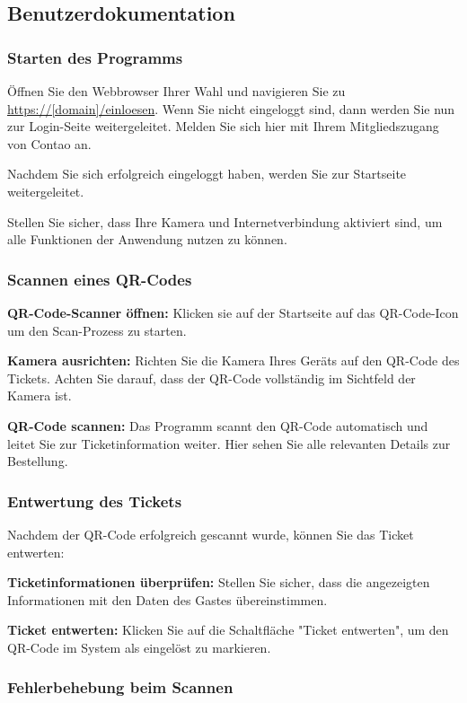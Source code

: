 \subsection{Benutzerdokumentation}
\label{app:BenutzerDoku}

\justifying

\subsubsection{Starten des Programms}
Öffnen Sie den Webbrowser Ihrer Wahl und navigieren Sie zu \url{https://[domain]/einloesen}. Wenn Sie nicht eingeloggt sind, dann werden Sie nun zur Login-Seite weitergeleitet. Melden Sie sich hier mit Ihrem Mitgliedszugang von Contao an.

Nachdem Sie sich erfolgreich eingeloggt haben, werden Sie zur Startseite weitergeleitet.

Stellen Sie sicher, dass Ihre Kamera und Internetverbindung aktiviert sind, um alle Funktionen der Anwendung nutzen zu können.

\subsubsection{Scannen eines QR-Codes}
\textbf{QR-Code-Scanner öffnen:} Klicken sie auf der Startseite auf das QR-Code-Icon um den Scan-Prozess zu starten.

\textbf{Kamera ausrichten:} Richten Sie die Kamera Ihres Geräts auf den QR-Code des Tickets. Achten Sie darauf, dass der QR-Code vollständig im Sichtfeld der Kamera ist.

\textbf{QR-Code scannen:} Das Programm scannt den QR-Code automatisch und leitet Sie zur Ticketinformation weiter. Hier sehen Sie alle relevanten Details zur Bestellung.


\subsubsection{Entwertung des Tickets}

Nachdem der QR-Code erfolgreich gescannt wurde, können Sie das Ticket entwerten:

\textbf{Ticketinformationen überprüfen:} Stellen Sie sicher, dass die angezeigten Informationen mit den Daten des Gastes übereinstimmen.

\textbf{Ticket entwerten:} Klicken Sie auf die Schaltfläche "Ticket entwerten", um den QR-Code im System als eingelöst zu markieren.


\subsubsection{Fehlerbehebung beim Scannen}

